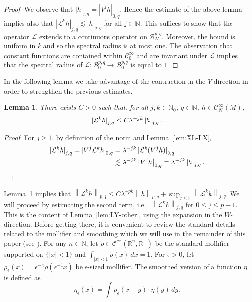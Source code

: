 \documentclass[a4paper,11pt]{amsart}
\newtheorem{lemma}[theorem]{Lemma}
\theoremstyle{remark}
\newcommand{\abs}[1]{\left|#1\right|} %
\newcommand{\cB}{\mathcal{B}} %
\newcommand{\cC}{\mathcal{C}} %
\newcommand{\cL}{\mathcal{L}} %
\newcommand{\bN}{\mathbb{N}} %
\newcommand{\bR}{\mathbb{R}} %
\newcommand{\norm}[1]{\left\|#1\right\|} %
\newcommand{\snorm}[1]{\left|#1\right|} %
\newcommand{\dv}{V} %
\newcommand{\dw}{W} %
\begin{document}
\begin{proof}
    We observe that \(\snorm{h}_{j,q} = \snorm{\dv^{j} h}_{0,q} \).
    Hence the estimate of the above lemma implies also that \(\snorm{\cL^k h}_{j,q} \lesssim \snorm{h}_{j,q}\) for all \(j\in \bN\).
    This suffices to show that the operator \(\cL\) extends to a continuous operator on \(\cB_{N}^{p,q}\).   
    Moreover, the bound is uniform in \(k\) and so the spectral radius is at most one.
    The observation that constant functions are contained within \(\cC^{\infty}_{0}\) and are invariant under \(\cL\) implies that the spectral radius of \(\cL  : \cB_{0}^{p,q} \to \cB_{0}^{p,q}\) is equal to \(1\).
\end{proof}

In the following lemma we take advantage of the contraction in the \(\dv\)-direction in order to strengthen the previous estimates.

\begin{lemma}
    \label{lem:LY-top}
    There exists \(C>0\) such that, for all \(j, k \in \bN_0\), \(q \in \bN\), \(h\in \cC^{\infty}_{N}(M)\),
    \[
        \snorm{\smash{\cL^k h}}_{j,q} \leq C \lambda^{-jk} \snorm{h}_{j,q}.
    \]
\end{lemma}

\begin{proof}
    For $j \geq 1$, by definition of the norm and Lemma~\ref{lem:XL-LX},
    \begin{align*}
        \snorm{\smash{\cL^k h}}_{j,q}
        = \snorm{\smash{\dv^j \cL^k h}}_{0,q}
         & = \lambda^{-jk} \snorm{\smash{\cL^k(\dv^j  h)}}_{0,q} \\
         & \lesssim \lambda^{-jk} \snorm{\dv^j  h}_{0,q}
        =  \lambda^{-jk} \snorm{h}_{j,q}. \qedhere
    \end{align*}
\end{proof}

Lemma~\ref{lem:LY-top} implies that \( \norm{\cL^k h}_{p,q} \leq C  \lambda^{-pk} \norm{h}_{p,q} + \sup_{j<p}  \norm{\cL^k h}_{j,q} \).
We will proceed by estimating the second term, i.e., \(\norm{\cL^k h}_{j,q} \) for \(0\leq j \leq p-1\).
This is the content of Lemma~\ref{lem:LY-other}, using the expansion in the \(\dw\)-direction.
Before getting there, it is convenient to review the standard details related to the mollifier and smoothing which we will use in the remainder of this paper (see \cite[\S4]{EG15}).
For any $n \in \bN$, let \(\rho \in \cC^\infty(\bR^n, \bR_{+})\) be the standard mollifier supported on \(\{\abs{x}<1\}\) and \(\int_{\abs{x}<1} \rho(x) \ dx = 1\).
For \(\epsilon>0\), let \(\rho_\epsilon(x) = \epsilon^{-n} \rho(\epsilon^{-1}x)\) be $\epsilon$-sized mollifier.
The smoothed version of a function $\eta$ is defined as 
\[\eta_\epsilon(x) = \int \rho_{\epsilon}(x-y) \cdot \eta(y) \ dy.\]
\end{document}

